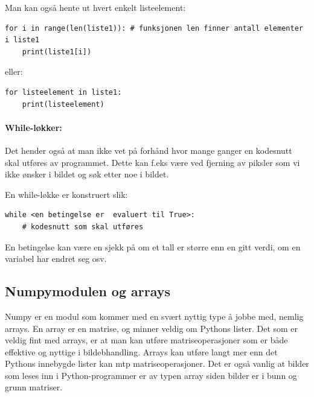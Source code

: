 \documentclass[%
oneside,                 %
final,                   %
10pt]{article}
\begin{document}
Man kan også hente ut hvert enkelt listeelement:
\begin{verbatim}
for i in range(len(liste1)): # funksjonen len finner antall elementer i liste1
    print(liste1[i])
\end{verbatim}
eller:
\begin{verbatim}
for listeelement in liste1:
    print(listeelement)
\end{verbatim}


\vspace{3mm}


\paragraph{While-løkker:}


\vspace{3mm}


Det hender også at man ikke vet på forhånd hvor mange ganger en kodesnutt skal utføres av programmet. Dette kan f.eks være ved fjerning av piksler som vi ikke ønsker i bildet og søk etter noe i bildet.

En while-løkke er konstruert slik:
\begin{verbatim}
while <en betingelse er  evaluert til True>:
    # kodesnutt som skal utføres
\end{verbatim}

En betingelse kan være en sjekk på om et tall er større enn en gitt verdi, om en variabel har endret seg osv.

\subsection{Numpymodulen og arrays}

Numpy er en modul som kommer med en svært nyttig type å jobbe med, nemlig arrays.
En array er en matrise, og minner veldig om Pythons lister. Det som er veldig fint med arrays, er at man kan utføre
matriseoperasjoner som er både effektive og nyttige i bildebhandling. Arrays kan utføre langt mer enn det Pythons innebygde lister kan mtp matriseoperasjoner.
Det er også vanlig at bilder som leses inn i Python-programmer
er av typen array siden bilder er i bunn og grunn matriser.
\end{document}
